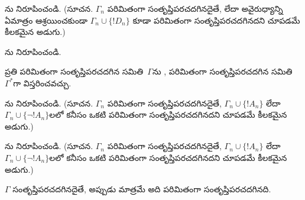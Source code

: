 \documentclass[../../../include/open-logic-section]{subfiles}
\begin{document}
\begin{prob}
ను నిరూపించండి. (సూచన.
$\Gamma_n$ పరిమితంగా సంతృప్తిపరచదగినదైతే,  లేదా
అవైరుధ్యాన్ని ఏమాత్రం ఆశ్రయించకుండా $\Gamma_n \cup \{!D_n\}$ కూడా
పరిమితంగా సంతృప్తిపరచదగినదని చూపడమే కీలకమైన అడుగు.)
\end{prob}
\tagendprob


\begin{prob}
ను నిరూపించండి.
\end{prob}
\tagendprob

\begin{lem}
 ప్రతి పరిమితంగా సంతృప్తిపరచదగిన
సమితి~$\Gamma$ను , పరిమితంగా సంతృప్తిపరచదగిన
సమితి~$\Gamma^*$గా విస్తరించవచ్చు.
\end{lem}

\begin{prob}
ను నిరూపించండి. (సూచన.
$\Gamma_n$ పరిమితంగా సంతృప్తిపరచదగినదైతే, $\Gamma_n \cup \{!A_n\}$
లేదా $\Gamma_n \cup \{\lnot !A_n\}$లలో కనీసం ఒకటి పరిమితంగా
సంతృప్తిపరచదగినదని చూపడమే కీలకమైన అడుగు.)
\end{prob}
\tagendprob

\begin{prob}
ను నిరూపించండి. (సూచన.
$\Gamma_n$ పరిమితంగా సంతృప్తిపరచదగినదైతే, $\Gamma_n \cup \{!A_n\}$
లేదా $\Gamma_n \cup \{\lnot !A_n\}$లలో కనీసం ఒకటి పరిమితంగా
సంతృప్తిపరచదగినదని చూపడమే కీలకమైన అడుగు.)
\end{prob}
\tagendprob

\begin{thm}[సంహతత్వం]
 $\Gamma$ సంతృప్తిపరచదగినదైతే, అప్పుడు
మాత్రమే అది పరిమితంగా సంతృప్తిపరచదగినది.
\end{thm}
\end{document}
